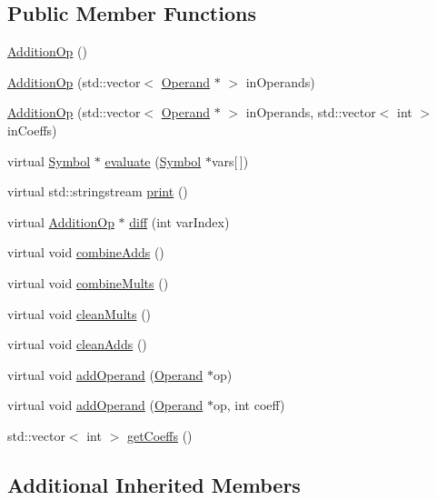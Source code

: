 \subsection*{Public Member Functions}
\begin{DoxyCompactItemize}
\item 
\hyperlink{class_addition_op_a17fcc4c0a906f2dc9d177cb306f45fb3}{Addition\+Op} ()
\item 
\hyperlink{class_addition_op_a3f4c3e0a00355c7c4a2a52d121da1e91}{Addition\+Op} (std\+::vector$<$ \hyperlink{class_operand}{Operand} $\ast$ $>$ in\+Operands)
\item 
\hyperlink{class_addition_op_a840ff52a9d90e1e49c6e3f44a0af6c34}{Addition\+Op} (std\+::vector$<$ \hyperlink{class_operand}{Operand} $\ast$ $>$ in\+Operands, std\+::vector$<$ int $>$ in\+Coeffs)
\item 
virtual \hyperlink{class_symbol}{Symbol} $\ast$ \hyperlink{class_addition_op_acc5fa1937f8e82d7e6356d2aa199a5e9}{evaluate} (\hyperlink{class_symbol}{Symbol} $\ast$vars\mbox{[}$\,$\mbox{]})
\item 
virtual std\+::stringstream \hyperlink{class_addition_op_a6e62b558d233e3c358d62e14941872dc}{print} ()
\item 
virtual \hyperlink{class_addition_op}{Addition\+Op} $\ast$ \hyperlink{class_addition_op_a0339b4c06997d4592c50f9bf72f578a3}{diff} (int var\+Index)
\item 
virtual void \hyperlink{class_addition_op_aae8debc8773974054d3acf6a5df231ff}{combine\+Adds} ()
\item 
virtual void \hyperlink{class_addition_op_abd35da4badb0e1b02ab271a8f87da472}{combine\+Mults} ()
\item 
virtual void \hyperlink{class_addition_op_ad04b68e36b5852ec2b951005b71cd56d}{clean\+Mults} ()
\item 
virtual void \hyperlink{class_addition_op_a4f573734c49e2acff6ae51f15a8698d6}{clean\+Adds} ()
\item 
virtual void \hyperlink{class_addition_op_a4a0b8c6e12b6c54857b8b318c6ba55f1}{add\+Operand} (\hyperlink{class_operand}{Operand} $\ast$op)
\item 
virtual void \hyperlink{class_addition_op_a07520d850b5ab6156d278aa474e5006d}{add\+Operand} (\hyperlink{class_operand}{Operand} $\ast$op, int coeff)
\item 
std\+::vector$<$ int $>$ \hyperlink{class_addition_op_a8f952105219f850c06b9eacd352d5b0b}{get\+Coeffs} ()
\end{DoxyCompactItemize}
\subsection*{Additional Inherited Members}


